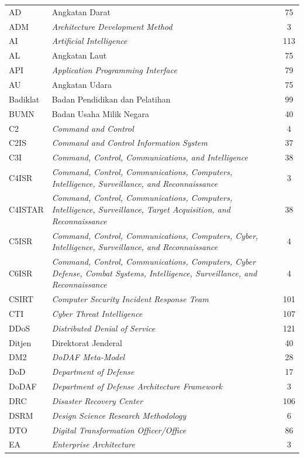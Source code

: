 \begin{longtable}{@{} l >{\raggedright\arraybackslash}p{7.2cm} c @{}}
AD & Angkatan Darat & 75 \\
ADM & \textit{Architecture Development Method} & 3 \\
AI & \textit{Artificial Intelligence} & 113 \\
AL & Angkatan Laut & 75 \\
API & \textit{Application Programming Interface} & 79 \\
AU & Angkatan Udara & 75 \\
Badiklat & Badan Pendidikan dan Pelatihan & 99 \\
BUMN & Badan Usaha Milik Negara & 40 \\
C2 & \textit{Command and Control} & 4 \\
C2IS & \textit{Command and Control Information System} & 37 \\
C3I & \textit{Command, Control, Communications, and Intelligence} & 38 \\
C4ISR & \textit{Command, Control, Communications, Computers, Intelligence, Surveillance, and Reconnaissance} & 3 \\
C4ISTAR & \textit{Command, Control, Communications, Computers, Intelligence, Surveillance, Target Acquisition, and Reconnaissance} & 38 \\
C5ISR & \textit{Command, Control, Communications, Computers, Cyber, Intelligence, Surveillance, and Reconnaissance} & 4 \\
C6ISR & \textit{Command, Control, Communications, Computers, Cyber Defense, Combat Systems, Intelligence, Surveillance, and Reconnaissance} & 4 \\
CSIRT & \textit{Computer Security Incident Response Team} & 101 \\
CTI & \textit{Cyber Threat Intelligence} & 107 \\
DDoS & \textit{Distributed Denial of Service} & 121 \\
Ditjen & Direktorat Jenderal & 40 \\
DM2 & \textit{DoDAF Meta-Model} & 28 \\
DoD & \textit{Department of Defense} & 17 \\
DoDAF & \textit{Department of Defense Architecture Framework} & 3 \\
DRC & \textit{Disaster Recovery Center} & 106 \\
DSRM & \textit{Design Science Research Methodology} & 6 \\
DTO & \textit{Digital Transformation Officer/Office} & 86 \\
EA & \textit{Enterprise Architecture} & 3 \\

\end{longtable}
